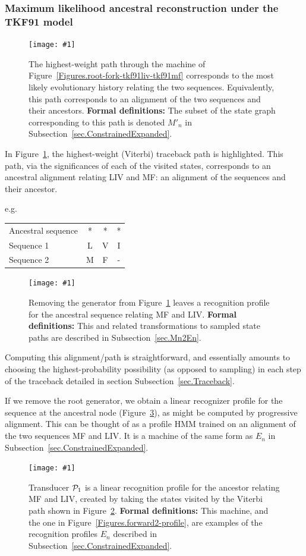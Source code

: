 \documentclass{article}
\newcommand{\secref}[1]{Subsection~\ref{sec.#1}}
\newcommand{\figref}[1]{Figure~\ref{Figures.#1}}
\newcommand{\figlabel}[1]{\label{Figures.#1}}
\newcommand{\easyfig}[4]{
\begin{figure}
\texttt{[image: \#1]}
\caption{ \figlabel{#3} #4}
\end{figure}}
\newcommand{\widepngfig}[2]{\easyfig{#1.png}{width=\textwidth}{#1}{#2}}
\newcommand{\widepdffig}[2]{\easyfig{#1-fig.pdf}{width=\textwidth}{#1}{#2}}
\newcommand\profile{{\cal P}}
\newcommand\formaldefs{{\bf Formal definitions: }}
\begin{document}
\subsubsection{Maximum likelihood ancestral reconstruction under the TKF91 model}

\widepngfig{viterbi-root-fork-tkf91liv-tkf91mf}{The highest-weight path through
the machine of \figref{root-fork-tkf91liv-tkf91mf}
 corresponds to the most likely evolutionary history relating the two sequences.  
Equivalently, this path corresponds to an alignment of the two sequences and their 
ancestors.
\formaldefs
The subset of the state graph corresponding to this path is denoted $M'_n$ in \secref{ConstrainedExpanded}.
}

In \figref{viterbi-root-fork-tkf91liv-tkf91mf}, the highest-weight (Viterbi) traceback path
is highlighted.  
This path, via the significances of each of the visited states, corresponds to 
an ancestral alignment relating LIV and MF: an alignment of the sequences and their ancestor.

e.g.
\begin{tabular}{lccc}
Ancestral sequence & * & * & * \\
Sequence 1         & L & V & I \\
Sequence 2         & M & F & -
\end{tabular}

\widepdffig{viterbi-fork-tkf91liv-tkf91mf}{Removing the generator from \figref{viterbi-root-fork-tkf91liv-tkf91mf} leaves a 
recognition profile for the ancestral sequence relating MF and LIV. 
\formaldefs
This and related transformations to sampled state paths are described in \secref{Mn2En}.}

Computing this alignment/path is straightforward, and essentially amounts to choosing
the highest-probability possibility (as opposed to sampling) 
in each step of the traceback detailed in
section \secref{Traceback}.  

If we remove  the root generator, we  obtain a linear recognizer profile
for the sequence at the ancestral node (\figref{viterbi-profile}),
as might be computed by progressive alignment.  
This can be thought of as a profile HMM trained on an alignment 
of the two sequences MF and LIV.  
It is a machine of the same form as $E_n$ in \secref{ConstrainedExpanded}.  

\widepdffig{viterbi-profile}{Transducer $\profile_1$ is a linear recognition profile for the 
ancestor relating MF and LIV, created by taking the states visited by the Viterbi path shown in \figref{viterbi-fork-tkf91liv-tkf91mf}.
\formaldefs
This machine, and the one in \figref{forward2-profile}, are examples of the recognition profiles $E_n$ described in \secref{ConstrainedExpanded}.  }
\end{document}
